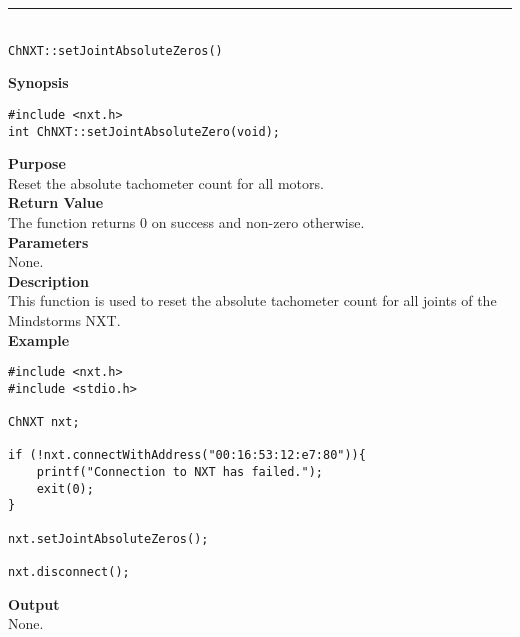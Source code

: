 \noindent
\vspace{5pt}
\rule{4.5in}{0.015in}\\
\noindent
{\LARGE \texttt{ChNXT::setJointAbsoluteZeros()} }\\


\noindent
{\bf Synopsis}
\vspace{-8pt}
\begin{verbatim}
#include <nxt.h>
int ChNXT::setJointAbsoluteZero(void);
\end{verbatim}

\noindent
{\bf Purpose}\\
Reset the absolute tachometer count for all motors.\\

\noindent
{\bf Return Value}\\
The function returns 0 on success and non-zero otherwise.\\

\noindent
{\bf Parameters}\\
None.\\

\noindent
{\bf Description}\\
This function is used to reset the absolute tachometer count for 
all joints of the Mindstorms NXT.\\

\noindent
{\bf Example}
\begin{verbatim}
#include <nxt.h> 
#include <stdio.h>

ChNXT nxt;

if (!nxt.connectWithAddress("00:16:53:12:e7:80")){
    printf("Connection to NXT has failed.");
    exit(0);
}
    
nxt.setJointAbsoluteZeros();

nxt.disconnect();
\end{verbatim}

\noindent
{\bf Output}\\
None.\\
\\
